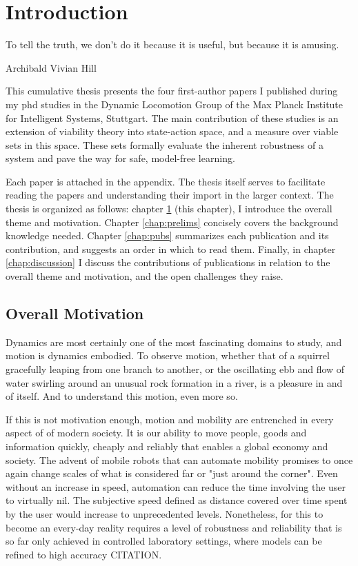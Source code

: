 
\chapter{Introduction} \label{chap:intro}
\epigraph{To tell the truth, we don't do it because it is useful, but because it is amusing.}{Archibald Vivian Hill}

This cumulative thesis presents the four first-author papers I published during my phd studies in the Dynamic Locomotion Group of the Max Planck Institute for Intelligent Systems, Stuttgart. The main contribution of these studies is an extension of viability theory into state-action space, and a measure over viable sets in this space. These sets formally evaluate the inherent robustness of a system and pave the way for safe, model-free learning. \par
Each paper is attached in the appendix. The thesis itself serves to facilitate reading the papers and understanding their import in the larger context. The thesis is organized as follows: chapter \ref{chap:intro} (this chapter), I introduce the overall theme and motivation.
Chapter \ref{chap:prelims} concisely covers the background knowledge needed.
Chapter \ref{chap:pubs} summarizes each publication and its contribution, and suggests an order in which to read them.
Finally, in chapter \ref{chap:discussion} I discuss the contributions of publications in relation to the overall theme and motivation, and the open challenges they raise.

\section{Overall Motivation}

Dynamics are most certainly one of the most fascinating domains to study, and motion is dynamics embodied. To observe motion, whether that of a squirrel gracefully leaping from one branch to another, or the oscillating ebb and flow of water swirling around an unusual rock formation in a river, is a pleasure in and of itself. And to understand this motion, even more so. \par

If this is not motivation enough, motion and mobility are entrenched in every aspect of of modern society. It is our ability to move people, goods and information quickly, cheaply and reliably that enables a global economy and society. The advent of mobile robots that can automate mobility promises to once again change scales of what is considered far or "just around the corner". Even without an increase in speed, automation can reduce the time involving the user to virtually nil. The subjective speed defined as distance covered over time spent by the user would increase to unprecedented levels. Nonetheless, for this to become an every-day reality requires a level of robustness and reliability that is so far only achieved in controlled laboratory settings, where models can be refined to high accuracy CITATION. \par

